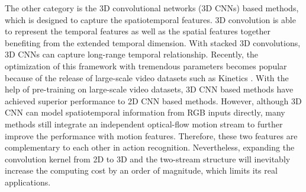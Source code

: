 \documentclass[10pt,twocolumn,letterpaper]{article}
\begin{document}
	The other category is the 3D convolutional networks (3D CNNs) based methods, which is designed to capture the spatiotemporal features\cite{tran2015learning, carreira2017quo, stroud2018d3d, chen20182}. 3D convolution is able to represent the temporal features as well as the spatial features together benefiting from the extended temporal dimension. With stacked 3D convolutions, 3D CNNs can capture long-range temporal relationship. Recently, the optimization of this framework with tremendous parameters becomes popular because of the release of large-scale video datasets such as Kinetics \cite{carreira2017quo}. With the help of pre-training on large-scale video datasets, 3D CNN based methods have achieved superior performance to 2D CNN based methods. However, although 3D CNN can model spatiotemporal information from RGB inputs directly, many methods \cite{varol2018long,carreira2017quo} still integrate an independent optical-flow motion stream to further improve the performance with motion features. Therefore, these two features are complementary to each other in action recognition. Nevertheless, expanding the convolution kernel from 2D to 3D and the two-stream structure will inevitably increase the computing cost by an order of magnitude, which limits its real applications.
	
\end{document}
